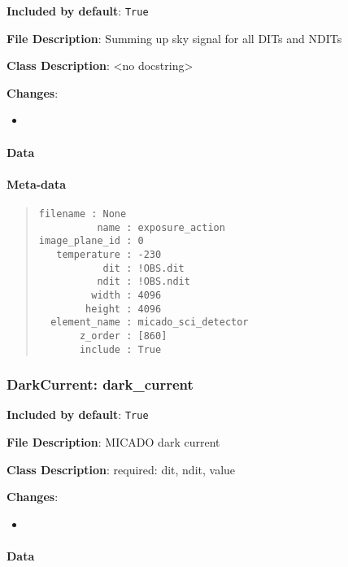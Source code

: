 \textbf{Included by default}: \texttt{True}

\textbf{File Description}: Summing up sky signal for all DITs and NDITs

\textbf{Class Description}: <no docstring>

\textbf{Changes}:

\begin{itemize}
\item \end{itemize}


\paragraph{Data%
  \label{id3}%
}


\paragraph{Meta-data%
  \label{id4}%
}

\begin{quote}
\begin{alltt}
\begin{lstlisting}[frame=single]
      filename : None
          name : exposure_action
image_plane_id : 0
   temperature : -230
           dit : !OBS.dit
          ndit : !OBS.ndit
         width : 4096
        height : 4096
  element_name : micado_sci_detector
       z_order : [860]
       include : True
\end{lstlisting}
\end{alltt}
\end{quote}


\subsubsection{DarkCurrent: \textquotedbl{}dark\_current\textquotedbl{}%
  \label{darkcurrent-dark-current}%
}

\textbf{Included by default}: \texttt{True}

\textbf{File Description}: MICADO dark current

\textbf{Class Description}: required: dit, ndit, value

\textbf{Changes}:

\begin{itemize}
\item \end{itemize}


\paragraph{Data%
  \label{id5}%
}


